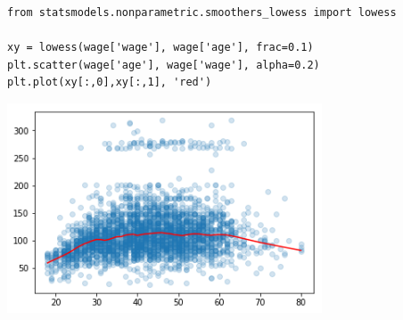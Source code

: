 \begin{frame}[fragile]\frametitle{}
\tiny	
\begin{lstlisting}
from statsmodels.nonparametric.smoothers_lowess import lowess

xy = lowess(wage['wage'], wage['age'], frac=0.1)
plt.scatter(wage['age'], wage['wage'], alpha=0.2)
plt.plot(xy[:,0],xy[:,1], 'red')
\end{lstlisting} 
\includegraphics[width=0.7\textwidth]{fig/lowess}
\end{frame}











%

%
%
%



